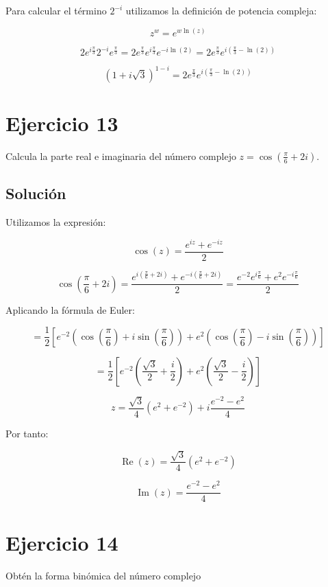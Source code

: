 \documentclass[fleqn]{article}
\begin{document}
	Para calcular el término $2^{-i}$ utilizamos la definición de potencia compleja:

	\[
	z^w=e^{w\ln(z)}
	\]

	\[
	2e^{i\frac{\pi}{3}} 2^{-i}e^{\frac{\pi}{3}}
	=
	2e^{\frac{\pi}{3}} e^{i\frac{\pi}{3}} e^{-i\ln(2)}
	=
	2e^{\frac{\pi}{3}} e^{i\left(\frac{\pi}{3}-\ln(2)\right)}
	\]

	\[
	\boxed{
	(1+i\sqrt{3})^{1-i}
	=
	2e^{\frac{\pi}{3}}
	e^{i\left(\frac{\pi}{3}-\ln(2)\right)}
	}
	\]
	
	\section{Ejercicio 13}
		Calcula la parte real e imaginaria del número complejo
		$z=\cos\left(\frac{\pi}{6}+2i\right)$.

		\subsection{Solución}

		Utilizamos la expresión:

		\[
		\cos(z)=\frac{e^{iz}+e^{-iz}}{2}
		\]

		\[
		\cos\left(\frac{\pi}{6}+2i\right)
		=
		\frac{
		e^{i\left(\frac{\pi}{6}+2i\right)}
		+
		e^{-i\left(\frac{\pi}{6}+2i\right)}
		}{2}
		=
		\frac{
		e^{-2}e^{i\frac{\pi}{6}}
		+
		e^2e^{-i\frac{\pi}{6}}
		}{2}
		\]

		Aplicando la fórmula de Euler:

		\[
		=
		\frac{1}{2}
		\left[
		e^{-2}
		\left(
		\cos\left(\frac{\pi}{6}\right)
		+i\sin\left(\frac{\pi}{6}\right)
		\right)
		+
		e^2
		\left(
		\cos\left(\frac{\pi}{6}\right)
		-i\sin\left(\frac{\pi}{6}\right)
		\right)
		\right]
		\]

		\[
		=
		\frac{1}{2}
		\left[
		e^{-2}\left(\frac{\sqrt{3}}{2}+\frac{i}{2}\right)
		+
		e^2\left(\frac{\sqrt{3}}{2}-\frac{i}{2}\right)
		\right]
		\]

		\[
		z
		=
		\frac{\sqrt{3}}{4}\left(e^2+e^{-2}\right)
		+
		i\frac{e^{-2}-e^2}{4}
		\]

		Por tanto:

		\[
		\boxed{
		\operatorname{Re}(z)
		=
		\frac{\sqrt{3}}{4}\left(e^2+e^{-2}\right)
		}
		\]

		\[
		\boxed{
		\operatorname{Im}(z)
		=
		\frac{e^{-2}-e^2}{4}
		}
		\]
	
	\section{Ejercicio 14}
		Obtén la forma binómica del número complejo
\end{document}
